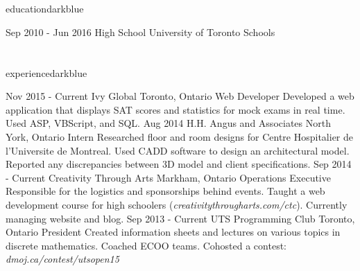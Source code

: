 \documentclass{resume}
\begin{document}
	\begin{main}
		\vspace{10pt}%
		\section{\faBook}{education}{darkblue}
			\begin{entrylist}
				\rightentry%
				{Sep 2010 - Jun 2016}%
				{High School}%
				{University of Toronto Schools}%
				{}{}
			\end{entrylist}
		\section{\faBriefcase}{experience}{darkblue}
			\begin{entrylist}
				\rightentry%
					{Nov 2015 - Current}%
					{Ivy Global}%
					{Toronto, Ontario}%
					{Web Developer}%
					{Developed a web application that displays SAT scores and statistics for mock exams in real time. Used ASP, VBScript, and SQL.}
				\rightentry%
					{Aug 2014}%
					{H.H. Angus and Associates}%
					{North York, Ontario}%
					{Intern}%
					{Researched floor and room designs for Centre Hospitalier de l'Universite de Montreal. Used CADD software to design an architectural model. Reported any discrepancies between 3D model and client specifications.}
				\rightentry%
					{Sep 2014 - Current}%
					{Creativity Through Arts}%
					{Markham, Ontario}%
					{Operations Executive}%
					{Responsible for the logistics and sponsorships behind events. Taught a web development course for high schoolers (\emph{creativitythrougharts.com/ctc}). Currently managing website and blog.}
				\rightentry%
					{Sep 2013 - Current}%
					{UTS Programming Club}%
					{Toronto, Ontario}%
					{President}%
					{Created information sheets and lectures on various topics in discrete mathematics. Coached ECOO teams. Cohosted a contest: \emph{dmoj.ca/contest/utsopen15}}
			\end{entrylist}

\end{main}
\end{document}
